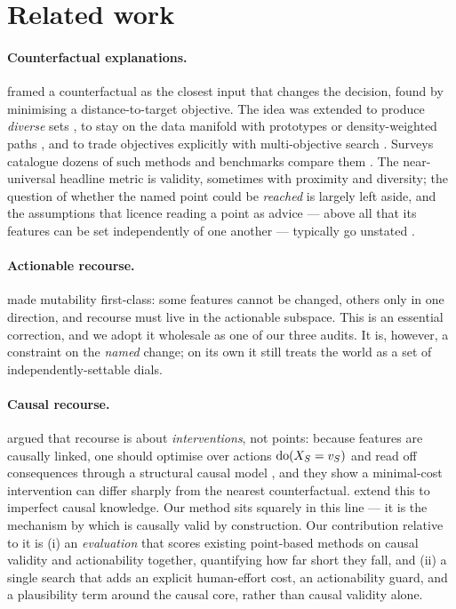 \section{Related work}
\label{sec:related}

\paragraph{Counterfactual explanations.} \citet{wachter2017counterfactual}
framed a counterfactual as the closest input that changes the decision, found by
minimising a distance-to-target objective. The idea was extended to produce
\emph{diverse} sets \citep{mothilal2020dice}, to stay on the data manifold with
prototypes \citep{vanlooveren2021interpretable} or density-weighted paths
\citep{poyiadzi2020face}, and to trade objectives explicitly with multi-objective
search \citep{dandl2020multi}. Surveys catalogue dozens of such methods
\citep{verma2020counterfactual,karimi2022survey} and benchmarks compare them
\citep{pawelczyk2021carla,klaise2021alibi}. The near-universal headline metric is
validity, sometimes with proximity and diversity; the question of whether the
named point could be \emph{reached} is largely left aside, and the assumptions
that licence reading a point as advice --- above all that its features can be set
independently of one another --- typically go unstated \citep{barocas2020hidden}.

\paragraph{Actionable recourse.} \citet{ustun2019actionable} made mutability
first-class: some features cannot be changed, others only in one direction, and
recourse must live in the actionable subspace. This is an essential correction,
and we adopt it wholesale as one of our three audits. It is, however, a constraint
on the \emph{named} change; on its own it still treats the world as a set of
independently-settable dials.

\paragraph{Causal recourse.} \citet{karimi2021recourse} argued that recourse is
about \emph{interventions}, not points: because features are causally linked, one
should optimise over actions $\mathrm{do}(X_S = v_S)$ and read off consequences
through a structural causal model \citep{pearl2009causality}, and they show a
minimal-cost intervention can differ sharply from the nearest counterfactual.
\citet{karimi2020imperfect} extend this to imperfect causal knowledge. Our method
sits squarely in this line --- it is the mechanism by which \cac{} is causally
valid by construction. Our contribution relative to it is (i) an \emph{evaluation}
that scores existing point-based methods on causal validity and actionability
together, quantifying how far short they fall, and (ii) a single search that adds
an explicit human-effort cost, an actionability guard, and a plausibility term
around the causal core, rather than causal validity alone.

